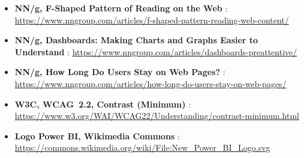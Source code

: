 {\begin{itemize}
	\item \textbf{NN/g, F-Shaped Pattern of Reading on the Web} : \url{https://www.nngroup.com/articles/f-shaped-pattern-reading-web-content/}
	\item \textbf{NN/g, Dashboards: Making Charts and Graphs Easier to Understand} : \url{https://www.nngroup.com/articles/dashboards-preattentive/}
	\item \textbf{NN/g, How Long Do Users Stay on Web Pages?} : \url{https://www.nngroup.com/articles/how-long-do-users-stay-on-web-pages/}
	\item \textbf{W3C, WCAG~2.2, Contrast (Minimum)} : \url{https://www.w3.org/WAI/WCAG22/Understanding/contrast-minimum.html}
	\item \textbf{Logo Power BI, Wikimedia Commons} : \url{https://commons.wikimedia.org/wiki/File:New_Power_BI_Logo.svg}
\end{itemize}
}
